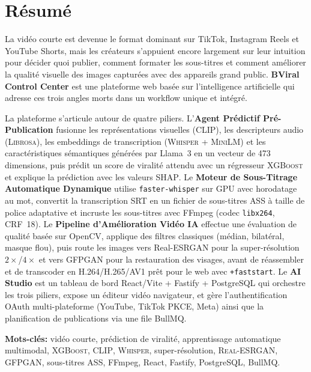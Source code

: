 \chapter*{R\'esum\'e}
\thispagestyle{plain}

\vspace{0.5cm}

La vid\'eo courte est devenue le format dominant sur TikTok, Instagram Reels et YouTube
Shorts, mais les cr\'eateurs s'appuient encore largement sur leur intuition pour d\'ecider quoi
publier, comment formater les sous-titres et comment am\'eliorer la qualit\'e visuelle des images
captur\'ees avec des appareils grand public. \textbf{BViral Control Center} est une plateforme web
bas\'ee sur l'intelligence artificielle qui adresse ces trois angles morts dans un workflow unique
et int\'egr\'e.

La plateforme s'articule autour de quatre piliers. L'\textbf{Agent Pr\'edictif Pr\'e-Publication}
fusionne les repr\'esentations visuelles (\textsc{CLIP}), les descripteurs audio (\textsc{Librosa}),
les embeddings de transcription (\textsc{Whisper} + \textsc{MiniLM}) et les caract\'eristiques
s\'emantiques g\'en\'er\'ees par Llama~3 en un vecteur de 473 dimensions, puis pr\'edit un score de
viralit\'e attendu avec un r\'egresseur \textsc{XGBoost} et explique la pr\'ediction avec les
valeurs \textsc{SHAP}. Le \textbf{Moteur de Sous-Titrage Automatique Dynamique} utilise
\texttt{faster-whisper} sur GPU avec horodatage au mot, convertit la transcription SRT en un
fichier de sous-titres \textsc{ASS} \`a taille de police adaptative et incruste les sous-titres avec
FFmpeg (codec \texttt{libx264}, CRF~18). Le \textbf{Pipeline d'Am\'elioration Vid\'eo IA} effectue une
\'evaluation de qualit\'e bas\'ee sur OpenCV, applique des filtres classiques (m\'edian, bilat\'eral,
masque flou), puis route les images vers Real-ESRGAN pour la super-r\'esolution $2\times$/$4\times$
et vers GFPGAN pour la restauration des visages, avant de r\'eassembler et de transcoder en
H.264/H.265/AV1 pr\^et pour le web avec \texttt{+faststart}. Le \textbf{AI Studio} est un tableau de
bord React/Vite + Fastify + PostgreSQL qui orchestre les trois piliers, expose un \'editeur
vid\'eo navigateur, et g\`ere l'authentification OAuth multi-plateforme (YouTube, TikTok PKCE,
Meta) ainsi que la planification de publications via une file BullMQ.

\vspace{0.6cm}

\noindent\textbf{Mots-cl\'es:} vid\'eo courte, pr\'ediction de viralit\'e, apprentissage automatique
multimodal, \textsc{XGBoost}, \textsc{CLIP}, \textsc{Whisper}, super-r\'esolution, \textsc{Real-ESRGAN},
\textsc{GFPGAN}, sous-titres ASS, FFmpeg, React, Fastify, PostgreSQL, BullMQ.

\cleardoublepage
